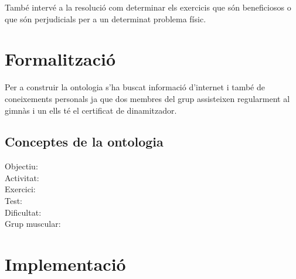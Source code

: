 \documentclass[a4paper, 12pt]{article}
\begin{document}
També intervé a la resolució com determinar els exercicis que són beneficiosos o que són perjudicials per a un determinat problema físic. 

\section{Formalització}

Per a construir la ontologia s'ha buscat informació d'internet i també de coneixements personals ja que dos membres del grup assisteixen regularment al gimnàs i un ells té el certificat de dinamitzador. 

\subsection{Conceptes de la ontologia}

\begin{description}
	\item[Objectiu:] 
	\item[Activitat:]
	\item[Exercici:]
	\item[Test:]
	\item[Dificultat:]
	\item[Grup muscular:]
\end{description}

\section{Implementació}
\end{document}
